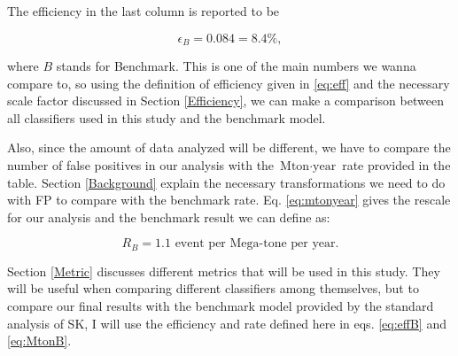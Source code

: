 The efficiency in the last column is reported to be 

\begin{equation} \label{eq:effB}
\epsilon_{B} = 0.084 = 8.4\%,
\end{equation}

where $B$ stands for Benchmark. This is one of the main numbers we wanna compare to, so using the definition of efficiency given in \ref{eq:eff} and the necessary scale factor discussed in Section \ref{Efficiency}, we can make a comparison between all classifiers used in this study and the benchmark model.

Also, since the amount of data analyzed will be different, we have to compare the number of false positives in our analysis with the $\textrm{Mton}\cdot\textrm{year}$ rate provided in the table. Section \ref{Background} explain the necessary transformations we need to do with FP to compare with the benchmark rate. Eq. \ref{eq:mtonyear} gives the rescale for our analysis and the benchmark result we can define as:

\begin{equation} \label{eq:MtonB}
R_{B} = 1.1\textrm{ event per Mega-tone per year}.
\end{equation}

Section \ref{Metric} discusses different metrics that will be used in this study. They will be useful when comparing different classifiers among themselves, but to compare our final results with the benchmark model provided by the standard analysis of SK, I will use the efficiency and rate defined here in eqs. \ref{eq:effB} and \ref{eq:MtonB}.

